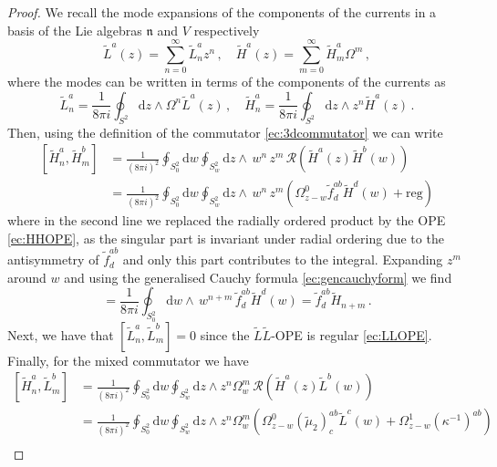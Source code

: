 \documentclass[11pt]{amsart}
\newcommand{\tL}{{\tilde L}}
\newcommand{\tH}{{\tilde H}}
\newcommand{\dr}{{\mathrm{d}}}
\newcommand{\fn}{\mathfrak{n}}
\numberwithin{equation}{section}
\numberwithin{figure}{section}
\numberwithin{table}{section}
\theoremstyle{thm}
\numberwithin{equation}{subsection}
\theoremstyle{definition}
\theoremstyle{rem}
\begin{document}
\begin{proof}
    We recall the mode expansions of the components of the currents in a basis of the Lie algebras $\fn$ and $V$ respectively
    \begin{equation}
        \tL^a(z) = \sum_{n=0}^\infty \tL^a_n z^n \,,\quad \tH^a(z) = \sum_{m=0}^\infty \tH^a_m \Omega^m \,,
    \end{equation}
where the modes can be written in terms of the components of the currents as 
\begin{equation}
    \tL_n^a = \frac{1}{8\pi i}\oint_{S^2} \dr z \wedge \Omega^n \tL^a(z) \,,\quad \tH^a_n=\frac{1}{8\pi i}\oint_{S^2} \dr z \wedge z^n  \tH^a(z)\,.
\end{equation}
Then, using the definition of the commutator \eqref{ec:3dcommutator} we can write
\begin{equation}
\begin{split}
    [\tH^a_n,\tH^b_m]
    &=\frac{1}{(8\pi i)^2}\oint_{S_0^2} \dr w \oint_{S_w^2} \dr z \wedge\,w^n \, z^m\, \mathcal{R}(\tH^a(z)\tH^b(w)) \\
    & =\frac{1}{(8\pi i)^2}\oint_{S_0^2} \dr w \oint_{S_w^2} \dr z \wedge\,w^n \, z^m  \left(\Omega_{z-w}^0 \tilde f^{ab}_d \tH^d(w) +\mathrm{reg}\right) 
\end{split}
\end{equation}
where in the second line we replaced the radially ordered product by the OPE \eqref{ec:HHOPE}, as the
singular part is invariant under radial ordering due to the antisymmetry of $\tilde f^{ab}_d$
and only this part contributes to the integral. Expanding $z^m$ around $w$ and using the generalised Cauchy formula \eqref{ec:gencauchyform} we find
\begin{equation}
    [\tH^a_n,\tH^b_m]=\frac{1}{8\pi i}\oint_{S_0^2} \dr w \wedge \,w^{n+m} \, \tilde f^{ab}_d \tH^d(w)= \tilde f^{ab}_d \tH_{n+m}\,.
\end{equation}
Next, we have that $[\tL_n^a,\tL_m^b]=0$ since the $\tL\tL$-OPE is regular \eqref{ec:LLOPE}. Finally, for the mixed commutator we have
\begin{equation}
\begin{split}
    [\tH_n^a,\tL_m^b] 
    &=\frac{1}{(8\pi i)^2}\oint_{S_0^2} \dr w \oint_{S_w^2} \dr z \wedge z^n \Omega_w^m \,\mathcal{R}(\tH^a(z)\tL^b(w)) \\
    &=\frac{1}{(8\pi i)^2}\oint_{S_0^2} \dr w \oint_{S_w^2} \dr z \wedge z^n\Omega_w^m\left(\Omega_{z-w}^0 (\tilde \mu_2)^{ab}_c \tL^c(w) + \Omega_{z-w}^1(\kappa^{-1})^{ab}\right) \\

\end{split}
\end{equation}
\end{proof}
\end{document}
